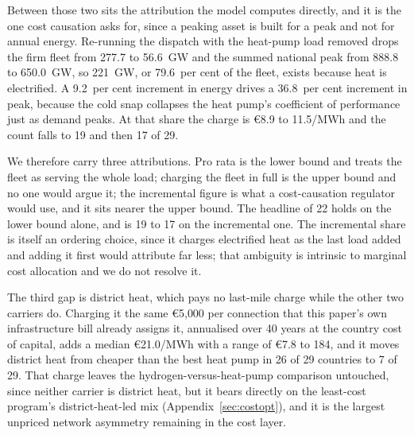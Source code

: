 Between those two sits the attribution the model computes directly, and it is the one
cost causation asks for, since a peaking asset is built for a peak and not for annual
energy. Re-running the dispatch with the heat-pump load removed drops the firm fleet from
277.7 to 56.6~GW and the summed national peak from 888.8 to 650.0~GW, so 221~GW, or
79.6~per cent of the fleet, exists because heat is electrified. A 9.2~per cent increment
in energy drives a 36.8~per cent increment in peak, because the cold snap collapses the
heat pump's coefficient of performance just as demand peaks. At that share the charge is
\euro{}8.9 to 11.5/MWh and the count falls to 19 and then 17 of 29.

We therefore carry three attributions. Pro rata is the lower bound and treats the fleet as
serving the whole load; charging the fleet in full is the upper bound and no one would
argue it; the incremental figure is what a cost-causation regulator would use, and it sits
nearer the upper bound. The headline of 22 holds on the lower bound alone, and is 19 to 17
on the incremental one. The incremental share is itself an ordering choice, since it
charges electrified heat as the last load added and adding it first would attribute far
less; that ambiguity is intrinsic to marginal cost allocation and we do not resolve it.

The third gap is district heat, which pays no last-mile charge while the other two
carriers do. Charging it the same \euro{}5{,}000 per connection that this paper's own
infrastructure bill already assigns it, annualised over 40 years at the country cost of
capital, adds a median \euro{}21.0/MWh with a range of \euro{}7.8 to 184, and it moves
district heat from cheaper than the best heat pump in 26 of 29 countries to 7 of 29.
That charge leaves the hydrogen-versus-heat-pump comparison untouched, since neither
carrier is district heat, but it bears directly on the least-cost program's
district-heat-led mix (Appendix~\ref{sec:costopt}), and it is the largest unpriced
network asymmetry remaining in the cost layer.

